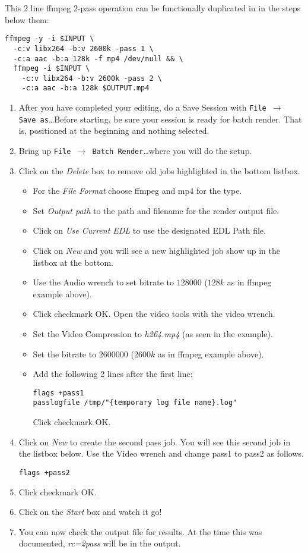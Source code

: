 This 2 line ffmpeg 2-pass operation can be functionally duplicated
in \CGG{} in the steps below them:

\begin{lstlisting}[style=sh]
ffmpeg -y -i $INPUT \
  -c:v libx264 -b:v 2600k -pass 1 \
  -c:a aac -b:a 128k -f mp4 /dev/null && \
  ffmpeg -i $INPUT \
    -c:v libx264 -b:v 2600k -pass 2 \
    -c:a aac -b:a 128k $OUTPUT.mp4
\end{lstlisting}

\begin{enumerate}
\item After you have completed your editing, do a Save Session with
  \texttt{File $\rightarrow$ Save as}\dots Before starting, be sure
  your session is ready for batch render. That is, positioned at the
  beginning and nothing selected.
\item Bring up \texttt{File $\rightarrow$ Batch Render}\dots where
  you will do the setup.
\item Click on the \textit{Delete} box to remove old jobs
  highlighted in the bottom listbox.
  \begin{itemize}
  \item For the \textit{File Format} choose ffmpeg and mp4 for the
    type.
  \item Set \textit{Output path} to the path and filename for the
    render output file.
  \item Click on \textit{Use Current EDL} to use the designated EDL
    Path file.
  \item Click on \textit{New} and you will see a new highlighted job
    show up in the listbox at the bottom.
  \item Use the Audio wrench to set bitrate to $128000$ ($128k$ as
    in ffmpeg example above).
  \item Click checkmark OK\@.  Open the video tools with the video
    wrench.
  \item Set the Video Compression to \textit{h264.mp4} (as seen in
    the example).
  \item Set the bitrate to $2600000$ ($2600k$ as in ffmpeg example
    above).
  \item Add the following 2 lines after the first line:
\begin{lstlisting}[style=sh]
flags +pass1
passlogfile /tmp/"{temporary log file name}.log"
\end{lstlisting} Click checkmark OK.
  \end{itemize}
\item Click on \textit{New} to create the second pass job.  You will
  see this second job in the listbox below.  Use the Video wrench and
  change pass1 to pass2 as follows.
\begin{lstlisting}[style=sh]
flags +pass2
\end{lstlisting}
\item Click checkmark OK.
\item Click on the \textit{Start} box and watch it go!
\item You can now check the output file for results.  At the time
  this was documented, \textit{rc=2pass} will be in the output.
\end{enumerate}

